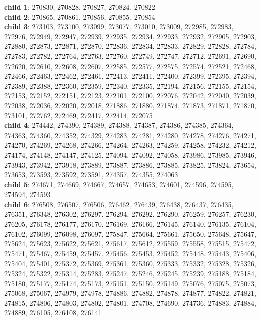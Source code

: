 \begin{itemize}
	\textbf{child 1}: 270830, 270828, 270827, 270824, 270822 \\
	\textbf{child 2}: 270865, 270861, 270856, 270855, 270854 \\
	\textbf{child 3}: 273103, 273100, 273099, 273077, 273010, 273009, 272985, 272983, 272976, 272949, 272947, 272939, 272935, 272934, 272933, 272932, 272905, 272903, 272880, 272873, 272871, 272870, 272836, 272834, 272833, 272829, 272828, 272784, 272783, 272782, 272764, 272763, 272760, 272749, 272747, 272712, 272691, 272690, 272620, 272610, 272608, 272607, 272585, 272577, 272575, 272574, 272521, 272468, 272466, 272463, 272462, 272461, 272413, 272411, 272400, 272399, 272395, 272394, 272389, 272388, 272360, 272359, 272340, 272335, 272194, 272156, 272155, 272154, 272153, 272152, 272151, 272123, 272101, 272100, 272076, 272042, 272040, 272039, 272038, 272036, 272020, 272018, 271886, 271880, 271874, 271873, 271871, 271870,  273101, 272762, 272469, 272417, 272414, 272075 \\
	\textbf{child 4}: 274442, 274390, 274389, 274388, 274387, 274386, 274385, 274364, 274363, 274360, 274352, 274329, 274283, 274281, 274280, 274278, 274276, 274271, 274270, 274269, 274268, 274266, 274264, 274263, 274259, 274258, 274232, 274212, 274174, 274148, 274147, 274125, 274094, 274092, 274058, 273986, 273985, 273946, 273943, 273942, 273918, 273889, 273887, 273886, 273885, 273825, 273824, 273654, 273653, 273593, 273592, 273591, 274357, 274355, 274063 \\
	\textbf{child 5}: 274671, 274669, 274667, 274657, 274653, 274601, 274596, 274595, 274594, 274593 \\
	\textbf{child 6}:  276508, 276507, 276506, 276462, 276439, 276438, 276437, 276435, 276351, 276348, 276302, 276297, 276294, 276292, 276290, 276259, 276257, 276230, 276205, 276178, 276177, 276170, 276169, 276166, 276145, 276140, 276135, 276104, 276102, 276099, 276098, 276097, 275847, 275664, 275661, 275650, 275648, 275647, 275624, 275623, 275622, 275621, 275617, 275612, 275559, 275558, 275515, 275472, 275471, 275467, 275459, 275457, 275456, 275453, 275452, 275448, 275443, 275406, 275404, 275401, 275372, 275369, 275361, 275360, 275333, 275332, 275328, 275326, 275324, 275322, 275314, 275283, 275247, 275246, 275245, 275239, 275188, 275184, 275180, 275177, 275174, 275173, 275151, 275150, 275149, 275076, 275075, 275073, 275068, 275067, 274979, 274978, 274886, 274882, 274878, 274877, 274822, 274821, 274815, 274806, 274803, 274802, 274801, 274708, 274690, 274736, 274883, 274884, 274889, 276105, 276108, 276141 \\

\end{itemize}
